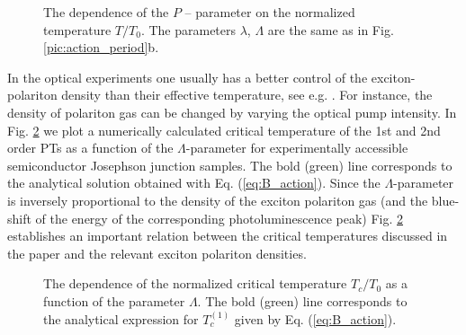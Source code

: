 \documentclass[aps, pre, preprint, groupedaddress, superscriptaddress, showkeys, showpacs] {revtex4-1}
\begin{document}
%
\begin{figure}[ht]
\caption
{The dependence of the $P$ -- parameter on the normalized temperature $T/T_{0}$.  The parameters $\lambda$, $\Lambda$ are the same as in Fig. \ref{pic:action_period}b.
\label{pic:p_parameter}}
\end{figure}
%
In the optical experiments one usually has a better control of the exciton-polariton density than their effective temperature, see e.g. \cite{Sanvitto,Guillet}.
For instance, the density of polariton gas can be changed by varying the optical pump intensity.
In Fig. \ref{pic:temperatures} we plot a numerically calculated critical temperature of the 1st and 2nd order PTs as a function of the $\Lambda$-parameter for experimentally accessible semiconductor Josephson junction samples.
The bold (green) line corresponds to the analytical solution obtained with  Eq. (\ref{eq:B_action}).
Since the $\Lambda$-parameter is inversely proportional to the density of the exciton polariton gas (and the blue-shift of the energy of the corresponding photoluminescence peak) Fig. \ref{pic:temperatures} establishes an important relation between the critical temperatures discussed in the paper and the relevant exciton polariton densities.
%
\begin{figure}[ht]
\caption
{The dependence of the normalized critical temperature $T_{c}/T_{0}$ as a function of the parameter $\Lambda$. The bold (green) line corresponds to the analytical expression for  $T_{c}^{(1)}$ given by Eq. (\ref{eq:B_action}).
\label{pic:temperatures}}
\end{figure}
%
\end{document}
